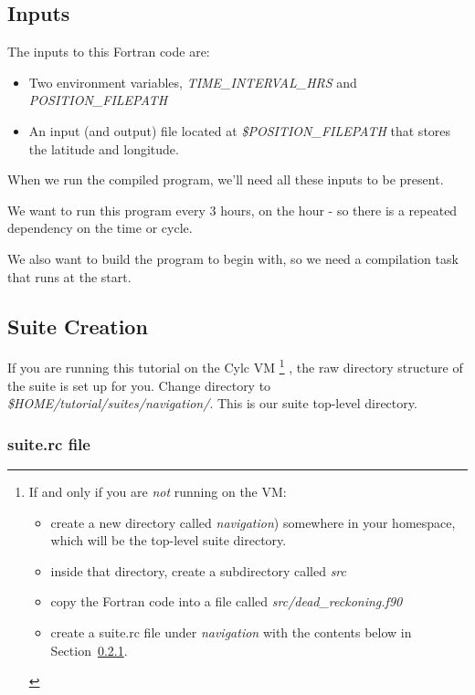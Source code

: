 \subsection{Inputs}

The inputs to this Fortran code are:
\begin{itemize}
    \item Two environment variables, {\em TIME\_INTERVAL\_HRS} and {\em POSITION\_FILEPATH}
    \item An input (and output) file located at {\em \$POSITION\_FILEPATH} that stores the latitude and longitude.
\end{itemize}

When we run the compiled program, we'll need all these inputs to be present.

We want to run this program every 3 hours, on the hour - so there is a repeated dependency on the time or cycle.

We also want to build the program to begin with, so we need a compilation task that runs at the start.

\subsection{Suite Creation}

If you are running this tutorial on the Cylc VM \footnote{
    If and only if you are {\em not} running on the VM:
\begin{itemize}
    \item create a new directory called {\em navigation}) somewhere in your homespace, which will be the top-level suite directory.
    \item inside that directory, create a subdirectory called {\em src}
    \item copy the Fortran code into a file called {\em src/dead\_reckoning.f90}
    \item create a suite.rc file under {\em navigation} with the contents below in Section~\ref{Suite Writing suite.rc file}.
\end{itemize}
} , the raw directory structure of the suite is set up for you. Change directory to {\em \$HOME/tutorial/suites/navigation/}. This is our suite top-level directory.

\subsubsection{suite.rc file}
\label{Suite Writing suite.rc file}

